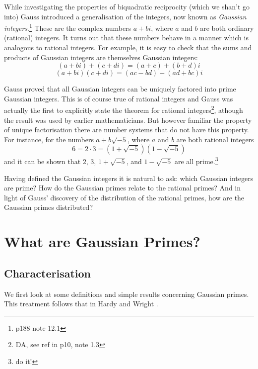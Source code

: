 \documentclass[a4paper]{article}
\begin{document}
While investigating the properties of biquadratic reciprocity (which we shan't go into)
Gauss introduced a generalisation of the integers, now known as \emph{Gauss\-ian integers}.\footnote{\cite{hardyandwright} p188 note 12.1}
These are the complex numbers $a + bi$, where $a$ and $b$ are both ordinary (rational) integers.
It turns out that these numbers behave in a manner which is analogous to rational integers.
For example, it is easy to check that the sums and products of Gaussian integers are themselves
Gaussian integers:
\begin{displaymath}
(a + bi) + (c + di) = (a + c) + (b + d)i
\end{displaymath}
\begin{displaymath}
(a + bi)(c + di) = (ac - bd) + (ad + bc)i
\end{displaymath}

Gauss proved that all Gaussian integers can be uniquely factored into prime Gaussian integers.
This is of course true of rational integers and Gauss was actually the first to
explicitly state the theorem for rational integers\footnote{DA, see ref in \cite{hardyandwright} p10, note 1.3},
athough the result was used by earlier mathematicians. But however familiar the property of
unique factorisation there are number systems that do not have this property. For instance, for
the numbers $a + b\sqrt{-5}$, where $a$ and $b$ are both rational integers
\begin{displaymath}
6 = 2\cdot 3 = (1 + \sqrt{-5})(1 - \sqrt{-5})
\end{displaymath}
and it can be shown that $2$, $3$, $1 + \sqrt{-5}$, and $1 - \sqrt{-5}$ are all prime.\footnote{do it!}

Having defined the Gaussian integers it is natural to ask: which Gaussian integers are prime?
How do the Gaussian primes relate to the rational primes? And in light of Gauss' discovery of
the distribution of the rational primes, how are the Gaussian primes distributed?

\section{What are Gaussian Primes?}

\subsection{Characterisation}
We first look at some definitions and simple results concerning Gaussian primes.
This treatment follows that in Hardy and Wright \cite{hardyandwright}.
\end{document}
